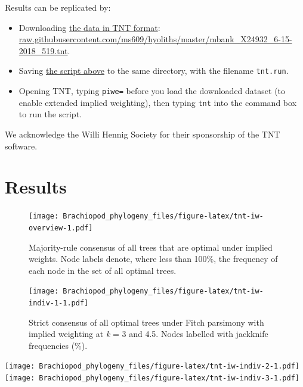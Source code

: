 \documentclass[openany]{book}
\providecommand{\tightlist}{%
  \setlength{\itemsep}{0pt}\setlength{\parskip}{0pt}}
\begin{document}
Results can be replicated by:

\begin{itemize}
\tightlist
\item
  Downloading
  \href{https://raw.githubusercontent.com/ms609/hyoliths/master/mbank_X24932_6-15-2018_519.tnt}{the
  data in TNT format}:
  \href{https://raw.githubusercontent.com/ms609/hyoliths/master/mbank_X24932_6-15-2018_519.tnt}{raw.githubusercontent.com/ms609/hyoliths/master/mbank\_X24932\_6-15-2018\_519.tnt}.
\item
  Saving
  \href{https://raw.githubusercontent.com/ms609/hyoliths/master/tnt.run}{the
  script above} to the same directory, with the filename
  \texttt{tnt.run}.
\item
  Opening TNT, typing \texttt{piwe=} before you load the downloaded
  dataset (to enable extended implied weighting), then typing
  \texttt{tnt} into the command box to run the script.
\end{itemize}

We acknowledge the Willi Hennig Society for their sponsorship of the TNT
software.

\section{Results}\label{results}









\begin{figure}
\centering
\texttt{[image: Brachiopod\_phylogeny\_files/figure-latex/tnt-iw-overview-1.pdf]}
\caption{\label{fig:tnt-iw-overview}Majority-rule consensus of all trees that are optimal
under implied weights. Node labels denote, where less than 100\%, the
frequency of each node in the set of all optimal trees.}
\end{figure}




\begin{figure}
\centering
\texttt{[image: Brachiopod\_phylogeny\_files/figure-latex/tnt-iw-indiv-1-1.pdf]}
\caption{\label{fig:tnt-iw-indiv-1}Strict consensus of all optimal trees under Fitch
parsimony with implied weighting at \emph{k} = 3 and 4.5.
Nodes labelled with jackknife frequencies (\%).}
\end{figure}

\texttt{[image: Brachiopod\_phylogeny\_files/figure-latex/tnt-iw-indiv-2-1.pdf]}
\texttt{[image: Brachiopod\_phylogeny\_files/figure-latex/tnt-iw-indiv-3-1.pdf]}
\end{document}
